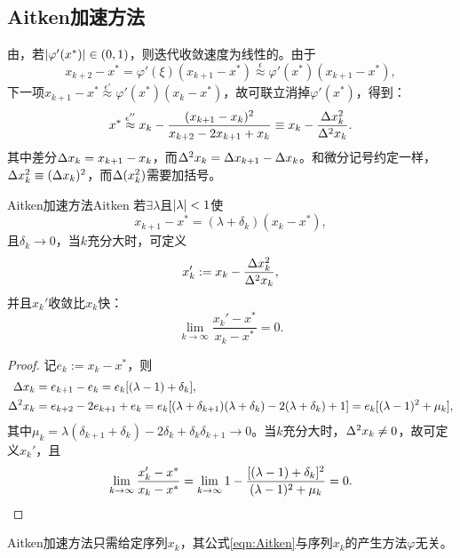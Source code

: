 \subsection{Aitken加速方法}

由，若$\left\lvert\varphi'(x^*)\right\rvert\in(0,1)$，则迭代收敛速度为线性的。由于
\[
    x_{k+2}-x^*=\varphi'(\xi)(x_{k+1}-x^*)\overset\epsilon\approx\varphi'(x^*)(x_{k+1}-x^*),
\]
下一项$x_{k+1}-x^*\overset{\epsilon'}\approx\varphi'(x^*)(x_k-x^*)$，故可联立消掉$\varphi'(x^*)$，得到：
\begin{equation}
    x^*\overset{\epsilon''}\approx x_k-\frac{(x_{k+1}-x_k)^2}{x_{k+2}-2x_{k+1}+x_k}\equiv x_k-\frac{\Delta x_k^2}{\Delta^2 x_k}.
\end{equation}
其中差分$\Delta x_k=x_{k+1}-x_k$，而$\Delta^2x_k=\Delta x_{k+1}-\Delta x_k$。和微分记号约定一样，$\Delta x_k^2\equiv(\Delta x_k)^2$，而$\Delta(x_k^2)$需要加括号。

\begin{theorem}
    {Aitken加速方法}{Aitken}
    若$\exists\lambda$且$\left\lvert\lambda\right\rvert<1$使
    \[
        x_{k+1}-x^*=(\lambda+\delta_k)(x_k-x^*),
    \]
    且$\delta_k\to0$，当$k$充分大时，可定义
    \begin{equation}
        \label{eqn:Aitken}
        x_k':=x_k-\frac{\Delta x_k^2}{\Delta^2x_k},
    \end{equation}
    并且$x_k'$收敛比$x_k$快：
    \[
        \lim_{k\to\infty}\frac{x_k'-x^*}{x_k-x^*}=0.
    \]
\end{theorem}

\begin{proof}
    记$e_k:=x_k-x^*$，则 
    \begin{align*}
        \Delta x_k&=e_{k+1}-e_k=e_k[(\lambda-1)+\delta_k],\\
        \Delta^2x_k&=e_{k+2}-2e_{k+1}+e_k=e_k[(\lambda+\delta_{k+1})(\lambda+\delta_k)-2(\lambda+\delta_k)+1]=e_k[(\lambda-1)^2+\mu_k],
    \end{align*}
    其中$\mu_k=\lambda(\delta_{k+1}+\delta_k)-2\delta_k+\delta_k\delta_{k+1}\to 0$。当$k$充分大时，$\Delta^2x_k\neq 0$，故可定义$x_k'$，且
    \[
        \lim_{k\to\infty}\frac{x_k'-x^*}{x_k-x^*}=\lim_{k\to\infty}1-\frac{[(\lambda-1)+\delta_k]^2}{(\lambda-1)^2+\mu_k}=0.
        \qedhere
    \]
\end{proof}

\begin{remark}
    Aitken加速方法只需给定序列$x_k$，其公式\eqref{eqn:Aitken}与序列$x_k$的产生方法$\varphi$无关。
\end{remark}

